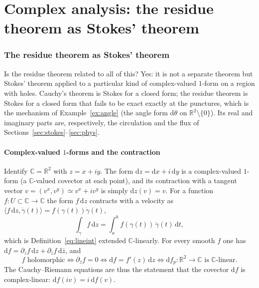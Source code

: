 \documentclass[11pt,a4paper]{article}
\numberwithin{equation}{section}
\theoremstyle{definition}
\theoremstyle{plain}
\newcommand{\R}{\mathbb{R}}
\newcommand{\C}{\mathbb{C}}
\newcommand{\dd}{\mathrm{d}}
\begin{document}
\part{Complex analysis: the residue theorem as Stokes' theorem}\label{part:complex}

\section{The residue theorem as Stokes' theorem}\label{sec:complex}

Is the residue theorem related to all of this? Yes: it is not a separate theorem but Stokes' theorem applied to a particular kind of complex-valued $1$-form on a region with holes.
Cauchy's theorem is Stokes for a closed form; the residue theorem is Stokes for a closed form that fails to be exact exactly at the punctures, which is the mechanism of Example~\ref{ex:angle}
(the angle form $\dd\theta$ on $\R^2\setminus\{0\}$). Its real and imaginary parts are, respectively, the circulation and the flux of Sections~\ref{sec:stokes}--\ref{sec:phys}.

\subsection{Complex-valued $1$-forms and the contraction}\label{sec:complexforms}

Identify $\C=\R^2$ with $z=x+iy$. The form $\dd z=\dd x+i\,\dd y$ is a complex-valued $1$-form (a $\C$-valued covector at each point), and its contraction with a tangent vector $v=(v^x,v^y)\simeq v^x+iv^y$ is simply $\dd z(v)=v$. For a function $f:U\subset\C\to\C$ the form $f\,\dd z$ contracts with a velocity as $\langle f\,\dd z,\dot\gamma(t)\rangle=f(\gamma(t))\dot\gamma(t)$,
\begin{equation}\label{eq:cint}
\int_\gamma f\,\dd z=\int_a^bf(\gamma(t))\,\dot\gamma(t)\,\dd t,
\end{equation}
which is Definition~\eqref{eq:lineint} extended $\C$-linearly. For every smooth $f$ one has $\dd f=\partial_zf\,\dd z+\partial_{\bar z}f\,\dd\bar z$, and
\begin{equation}\label{eq:holo}
f\text{ holomorphic}\iff\partial_{\bar z}f=0\iff\dd f=f'(z)\,\dd z\iff\dd f_p:\R^2\to\C\text{ is }\C\text{-linear}.
\end{equation}
The Cauchy--Riemann equations are thus the statement that the covector $\dd f$ is complex-linear: $\dd f(iv)=i\,\dd f(v)$.
\end{document}
